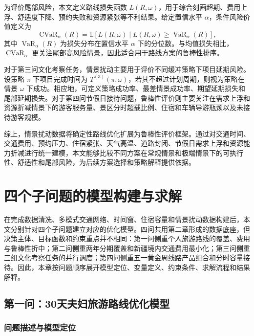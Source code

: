 \documentclass[UTF8,zihao=-4,a4paper]{ctexart}
\begin{document}
为评价尾部风险，本文定义路线损失函数 $L(R,\omega)$，用于综合刻画超期、费用上浮、舒适度下降、预约失败和资源紧张等不利结果。给定置信水平 $\alpha$，条件风险价值定义为
\[
\operatorname{CVaR}_{\alpha}(R)
=
\mathbb{E}
\left[
L(R,\omega)
\mid
L(R,\omega)\geq
\operatorname{VaR}_{\alpha}(R)
\right],
\]
其中 $\operatorname{VaR}_{\alpha}(R)$ 为损失分布在置信水平 $\alpha$ 下的分位数。与均值损失相比，$\operatorname{CVaR}_{\alpha}$ 更关注尾部高风险情景，因此适合用于路线方案的鲁棒性排序。

对于第三问文化考察任务，情景扰动主要用于评价不同缓冲策略下项目延期风险。设策略 $\pi$ 下项目完成时间为 $T^{(3)}(\pi,\omega)$，若其不超过计划周期，则视为策略在情景 $\omega$ 下成功。相应地，可定义策略成功率、最差情景成功率、期望延期损失和尾部延期损失。对于第四问节假日接待问题，鲁棒性评价则主要关注在需求上浮和资源折减情景下的游客服务量、景区分时超载比例、住宿和车辆导游瓶颈以及未接待游客规模。

综上，情景扰动数据将确定性路线优化扩展为鲁棒性评价框架。通过对交通时间、交通费用、预约压力、住宿紧张、天气高温、道路封闭、节假日需求上浮和资源能力折减进行统一建模，本文能够比较不同方案在常规情景和极端情景下的可执行性、舒适性和尾部风险，为后续方案选择和策略解释提供依据。

\clearpage

\section{四个子问题的模型构建与求解}
\label{sec:question_models}

在完成数据清洗、多模式交通网络、时间窗、住宿容量和情景扰动数据构建后，本文分别针对四个子问题建立对应的优化模型。四问共用第二章形成的数据底座，但决策主体、目标函数和约束重点并不相同：第一问侧重个人旅游路线的覆盖、费用与鲁棒性折中；第二问侧重两年分期覆盖和新疆境内交通费用最小化；第三问侧重三组文化考察任务的并行调度；第四问侧重五一黄金周线路产品组合和分时容量接待。因此，本章按问题顺序展开模型定位、变量定义、约束条件、求解流程和结果解释。

\subsection{第一问：30天夫妇旅游路线优化模型}
\label{subsec:q1_model}

\subsubsection{问题描述与模型定位}
\label{subsubsec:q1_problem_position}
\end{document}
